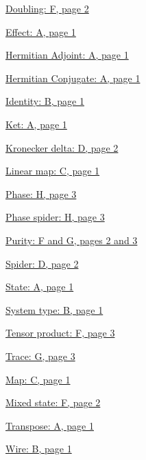 \documentclass[]{article}
\begin{document}
\hyperref[doubling]{Doubling: F, page 2}

\hyperref[braandket]{Effect: A, page 1}

\hyperref[braandket]{Hermitian Adjoint: A, page 1}

\hyperref[braandket]{Hermitian Conjugate: A, page 1}

\hyperref[identity]{Identity: B, page 1}

\hyperref[braandket]{Ket: A, page 1}

\hyperref[spiders]{Kronecker delta: D, page 2}

\hyperref[maps]{Linear map: C, page 1}

\hyperref[phasespiders]{Phase: H, page 3}

\hyperref[phasespiders]{Phase spider: H, page 3}

\hyperref[doubling]{Purity: F and G, pages 2 and 3}

\hyperref[spiders]{Spider: D, page 2}

\hyperref[braandket]{State: A, page 1}

\hyperref[identity]{System type: B, page 1}

\hyperref[doubling]{Tensor product: F, page 3}

\hyperref[discarding]{Trace: G, page 3}

\hyperref[maps]{Map: C, page 1}

\hyperref[doubling]{Mixed state: F, page 2}

\hyperref[braandket]{Transpose: A, page 1}

\hyperref[identity]{Wire: B, page 1}
\end{document}

